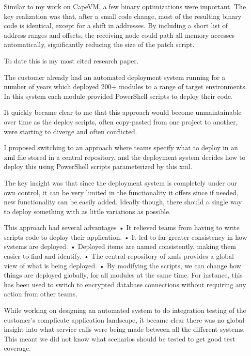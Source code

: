 \documentclass[10pt,a4paper]{../altacv}
\begin{document}
\begin{fullwidth}
\medskip

Similar to my work on CapeVM, a few binary optimizations were important. The key realization was that, after a small code change, most of the resulting binary code is identical, except for a shift in addresses. By including a short list of address ranges and offsets, the receiving node could path all memory accesses automatically, significantly reducing the size of the patch script.

\medskip

To date this is my most cited research paper.

The customer already had an automated deployment system running for a number of years which deployed 200+ modules to a range of target environments. In this system each module provided PowerShell scripts to deploy their code.

\medskip

It quickly became clear to me that this approach would become unmaintainable over time as the deploy scripts, often copy-pasted from one project to another, were starting to diverge and often conflicted.

\medskip

I proposed switching to an approach where teams specify what to deploy in an xml file stored in a central repository, and the deployment system decides how to deploy this using PowerShell scripts parameterized by this xml.

\medskip

The key insight was that since the deployment system is completely under our own control, it can be very limited in the functionality it offers since if needed, new functionality can be easily added. Ideally though, there should a single way to deploy something with as little variations as possible.

\medskip

This approach had several advantages
•	It relieved teams from having to write scripts code to deploy their application.
•	It led to far greater consistency in how systems are deployed.
•	Deployed items are named consistently, making them easier to find and identify.
•	The central repository of xmls provides a global view of what is being deployed.
•	By modifying the scripts, we can change how things are deployed globally, for all modules at the same time. For instance, this has been used to switch to encrypted database connections without requiring any action from other teams.

While working on designing an automated system to do integration testing of the customer’s complicate application landscape, it became clear there was no global insight into what service calls were being made between all the different systems. This meant we did not know what scenarios should be tested to get good test coverage.


\end{fullwidth}
\end{document}
